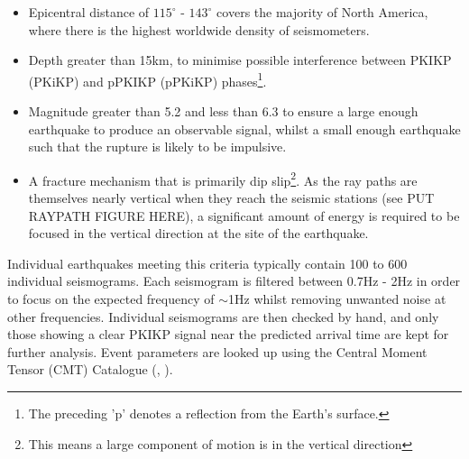 \documentclass[11pt,a4paper]{article}
\begin{document}
\begin{itemize}
	\item Epicentral distance of $115^{\circ}$ - $143^{\circ}$ covers the majority of North America, where there is the highest worldwide density of seismometers.
	\item  Depth greater than 15km, to minimise possible interference between PKIKP (PKiKP) and pPKIKP (pPKiKP) phases\footnote{The preceding 'p' denotes a reflection from the Earth's surface.}.
	\item Magnitude greater than 5.2 and less than 6.3 to ensure a large enough earthquake to produce an observable signal, whilst a small enough earthquake such that the rupture is likely to be impulsive.
	\item A fracture mechanism that is primarily dip slip\footnote{This means a large component of motion is in the vertical direction}. As the ray paths are themselves nearly vertical when they reach the seismic stations (see PUT RAYPATH FIGURE HERE), a significant amount of energy is required to be focused in the vertical direction at the site of the earthquake.
\end{itemize}

Individual earthquakes meeting this criteria typically contain 100 to 600 individual seismograms. Each seismogram is filtered between 0.7Hz - 2Hz in order to focus on the expected frequency of $\sim$1Hz whilst removing unwanted noise at other frequencies. Individual seismograms are then checked by hand, and only those showing a clear PKIKP signal near the predicted arrival time are kept for further analysis. Event parameters are looked up using the Central Moment Tensor (CMT) Catalogue (\cite{Dziewonski1981}, \cite{Ekstrom2012}).

\end{document}
